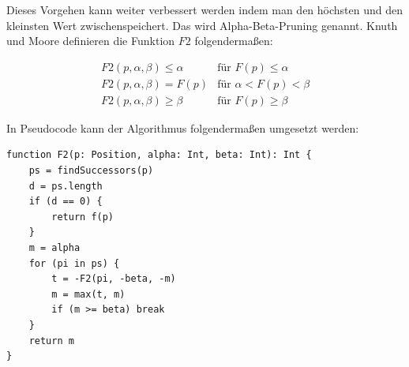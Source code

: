 Dieses Vorgehen kann weiter verbessert werden indem man den höchsten und den kleinsten Wert zwischenspeichert. Das wird Alpha-Beta-Pruning genannt. Knuth und Moore definieren die Funktion $F2$ folgendermaßen:

\begin{equation*}
    \begin{array}{ll}
        F2(p, \alpha, \beta) \leq \alpha & \text{für }F(p) \leq \alpha \\
        F2(p, \alpha, \beta) = F(p) & \text{für }\alpha < F(p) < \beta \\
        F2(p, \alpha, \beta) \geq \beta & \text{für }F(p) \geq \beta
    \end{array}
\end{equation*}

In Pseudocode kann der Algorithmus folgendermaßen umgesetzt werden:
\begin{lstlisting}[caption=Alpha-Beta-Pruning,label=alphabeta]
function F2(p: Position, alpha: Int, beta: Int): Int {
    ps = findSuccessors(p)
    d = ps.length
    if (d == 0) {
        return f(p)
    }
    m = alpha
    for (pi in ps) {
        t = -F2(pi, -beta, -m)
        m = max(t, m)
        if (m >= beta) break
    }
    return m
}
\end{lstlisting}


